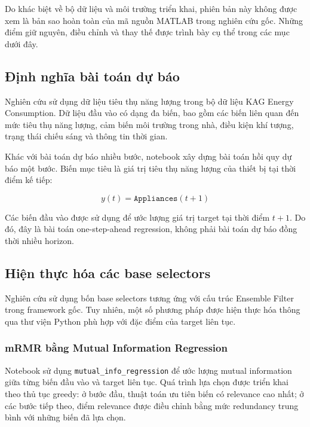 Do khác biệt về bộ dữ liệu và môi trường triển khai, phiên bản
này không được xem là bản sao hoàn toàn của mã nguồn MATLAB
trong nghiên cứu gốc. Những điểm giữ nguyên, điều chỉnh và
thay thế được trình bày cụ thể trong các mục dưới đây.

\subsection{Định nghĩa bài toán dự báo}
\label{subsec:implemented-forecasting-task}

Nghiên cứu sử dụng dữ liệu tiêu thụ năng lượng trong bộ dữ liệu
KAG Energy Consumption. Dữ liệu đầu vào có dạng đa biến, bao gồm
các biến liên quan đến mức tiêu thụ năng lượng, cảm biến môi
trường trong nhà, điều kiện khí tượng, trạng thái chiếu sáng
và thông tin thời gian.

Khác với bài toán dự báo nhiều bước, notebook xây dựng bài toán
hồi quy dự báo một bước. Biến mục tiêu là giá trị tiêu thụ năng
lượng của thiết bị tại thời điểm kế tiếp:

\begin{equation}
    y(t) = \texttt{Appliances}(t+1)
    \label{eq:implemented-target}
\end{equation}

Các biến đầu vào được sử dụng để ước lượng giá trị target tại
thời điểm $t+1$. Do đó, đây là bài toán one-step-ahead regression,
không phải bài toán dự báo đồng thời nhiều horizon.

\subsection{Hiện thực hóa các base selectors}
\label{subsec:implemented-base-selectors}

Nghiên cứu sử dụng bốn base selectors tương ứng với cấu trúc
Ensemble Filter trong framework gốc. Tuy nhiên, một số phương pháp
được hiện thực hóa thông qua thư viện Python phù hợp với đặc điểm
của target liên tục.

\subsubsection{mRMR bằng Mutual Information Regression}

Notebook sử dụng \texttt{mutual\_info\_regression} để ước lượng
mutual information giữa từng biến đầu vào và target liên tục.
Quá trình lựa chọn được triển khai theo thủ tục greedy:
ở bước đầu, thuật toán ưu tiên biến có relevance cao nhất;
ở các bước tiếp theo, điểm relevance được điều chỉnh bằng
mức redundancy trung bình với những biến đã lựa chọn.

